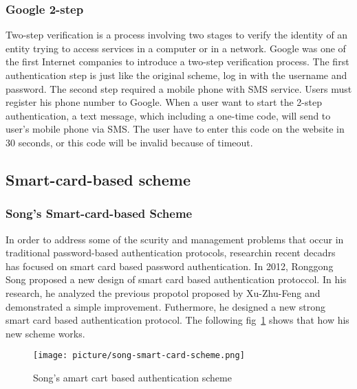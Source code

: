 \begin{CJK}{Bg5}{bsmi}
\subsubsection{Google 2-step}

Two-step verification is a process involving two stages to verify the identity of an entity trying to access services in a computer or in a network. Google was one of the first Internet companies to introduce a two-step verification process. The first authentication step is just like the original scheme, log in with the username and password. The second step required a mobile phone with SMS service. Users must register his phone number to Google. When a user want to start the 2-step authentication, a text message, which including a one-time code, will send to user's mobile phone via SMS. The user have to enter this code on the website in 30 seconds, or this code will be invalid because of timeout.

\subsection{Smart-card-based scheme}

\subsubsection{Song's Smart-card-based Scheme}

In order to address some of the scurity and management problems that occur in traditional password-based authentication protocols, researchin recent decadrs has focused on smart card based password authentication. In 2012, Ronggong Song proposed a new design of smart card based authentication protoccol. In his research, he analyzed the previous propotol proposed by Xu-Zhu-Feng and demonstrated a simple improvement. Futhermore, he designed a new strong smart card based authentication protocol. The following fig~\ref{fig:song-smard-card-scheme} shows that how his new scheme works.

\begin{figure}
\centering
\texttt{[image: picture/song-smart-card-scheme.png]}
\caption{Song's amart cart based authentication scheme}
\label{fig:song-smard-card-scheme}
\end{figure}
\end{CJK}
